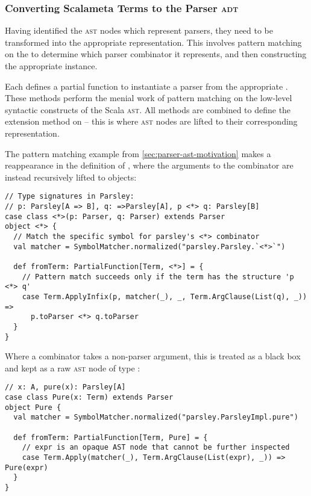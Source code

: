 \documentclass[../../main.tex]{subfiles}
\begin{document}
\subsubsection{Converting Scalameta Terms to the Parser \textsc{adt}}
Having identified the \textsc{ast} nodes which represent parsers, they need to be transformed into the appropriate  representation.
This involves pattern matching on the  to determine which parser combinator it represents, and then constructing the appropriate  instance.

Each  defines a partial function  to instantiate a parser from the appropriate .
These  methods perform the menial work of pattern matching on the low-level syntactic constructs of the Scala \textsc{ast}.
All  methods are combined to define the  extension method on  -- this is where \textsc{ast} nodes are lifted to their corresponding  representation.

The pattern matching example from \cref{sec:parser-ast-motivation} makes a reappearance in the definition of , where the arguments to the \scala{<*>} combinator are instead recursively lifted to  objects:
\begin{verbatim}
// Type signatures in Parsley:
// p: Parsley[A => B], q: =>Parsley[A], p <*> q: Parsley[B]
case class <*>(p: Parser, q: Parser) extends Parser
object <*> {
  // Match the specific symbol for parsley's <*> combinator
  val matcher = SymbolMatcher.normalized("parsley.Parsley.`<*>`")

  def fromTerm: PartialFunction[Term, <*>] = {
    // Pattern match succeeds only if the term has the structure 'p <*> q'
    case Term.ApplyInfix(p, matcher(_), _, Term.ArgClause(List(q), _)) =>
      p.toParser <*> q.toParser
  }
}
\end{verbatim}
%
Where a combinator takes a non-parser argument, this is treated as a black box and kept as a raw \textsc{ast} node of type :
\begin{verbatim}
// x: A, pure(x): Parsley[A]
case class Pure(x: Term) extends Parser
object Pure {
  val matcher = SymbolMatcher.normalized("parsley.ParsleyImpl.pure")

  def fromTerm: PartialFunction[Term, Pure] = {
    // expr is an opaque AST node that cannot be further inspected
    case Term.Apply(matcher(_), Term.ArgClause(List(expr), _)) => Pure(expr)
  }
}
\end{verbatim}
\end{document}
